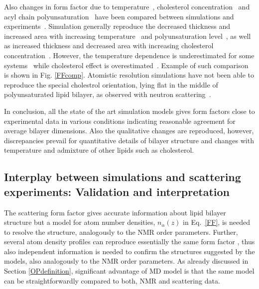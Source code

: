 \documentclass[aps,prl,superscriptaddress,twocolumn]{revtex4}
\begin{document}
Also changes in form factor due to temperature~\cite{jambeck12,zhuang14}, cholesterol concentration~\cite{jambeck13,madej15} 
and acyl chain polyunsaturation~\cite{eldho03,klauda12} have been compared between simulations and 
experiments~\cite{eldho03,kucerka05a,pan08,hodzic08,kucerka08,pan09,khelasvili10,kucerka11}.
Simulation generally reproduce the decreased thickness and increased area with increasing temperature~\cite{jambeck12,zhuang14} and 
polyunsaturation level~\cite{eldho03,klauda12}, 
as well as increased thickness and decreased area with increasing cholesterol concentration~\cite{jambeck13,madej15}.
However, the temperature dependence is underestimated for some systems~\cite{jambeck12,zhuang14} while cholesterol
effect is overestimated~\cite{jambeck13,madej15}. Example of such comparison is shown in Fig. \ref{FFcomp}.
Atomistic resolution simulations have not been able to reproduce the special cholestrol orientation, lying flat in
the middle of polyunsaturated lipid bilayer, as observed with neutron scattering~\cite{harroun08,marrink08,kucerka10b}.

In conclusion, all the state of the art simulation models gives form factors close to experimental
data in various conditions indicating reasonable agreement for average bilayer dimensions. Also the qualitative changes are reproduced, however, 
discrepancies prevail for quantitative details of bilayer structure and changes with temperature and admixture of other lipids such as cholesterol.


\subsection{Interplay between simulations and scattering experiments: Validation and interpretation}
The scattering form factor gives accurate information about lipid
bilayer structure but a model for atom number densities, $n_\alpha(z)$ in Eq.~\ref{FF}, is needed to 
resolve the structure, analogously to the NMR order parameters. Further, several atom density
profiles can reproduce essentially the same form factor \cite{kucerka08a}, thus also independent information is needed to 
confirm the structures suggested by the models, also analogously to the NMR order parameters. 
As already discussed in Section \ref{OPdefinition}, significant advantage of MD model is that the same model 
can be straightforwardly compared to both, NMR and scattering data.
\end{document}
